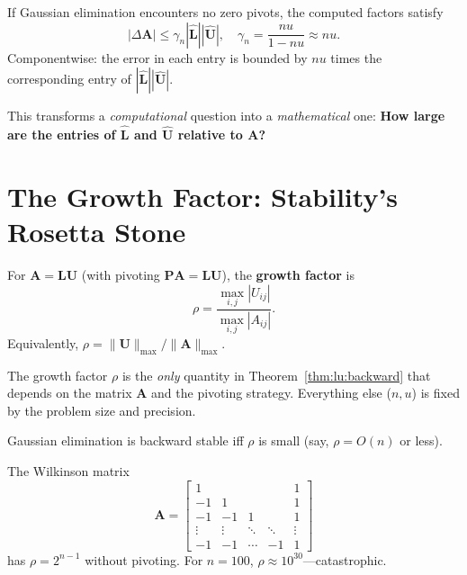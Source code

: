 \begin{theorem}
\label{thm:lu:backward}
If Gaussian elimination encounters no zero pivots, the computed factors satisfy
\[
|\Delta\bm{A}| \le \gamma_n |\hat{\bm{L}}| |\hat{\bm{U}}|,
\quad \gamma_n = \frac{nu}{1-nu} \approx nu.
\]
Componentwise: the error in each entry is bounded by $nu$ times the corresponding entry of $|\hat{\bm{L}}||\hat{\bm{U}}|$.
\end{theorem}

This transforms a \emph{computational} question into a \emph{mathematical} one: \textbf{How large are the entries of $\hat{\bm{L}}$ and $\hat{\bm{U}}$ relative to $\bm{A}$?}

\section{The Growth Factor: Stability's Rosetta Stone}
\label{sec:ge:growth}

\begin{definition}
\label{def:growth}
For $\bm{A} = \bm{L}\bm{U}$ (with pivoting $\bm{P}\bm{A} = \bm{L}\bm{U}$), the \textbf{growth factor} is
\[
\rho = \frac{\max_{i,j} |U_{ij}|}{\max_{i,j} |A_{ij}|}.
\]
Equivalently, $\rho = \|\bm{U}\|_{\max} / \|\bm{A}\|_{\max}$.
\end{definition}

The growth factor $\rho$ is the \emph{only} quantity in Theorem~\ref{thm:lu:backward} that depends on the matrix $\bm{A}$ and the pivoting strategy. Everything else ($n, u$) is fixed by the problem size and precision.

\begin{corollary}
Gaussian elimination is backward stable iff $\rho$ is small (say, $\rho = O(n)$ or less).
\end{corollary}

\begin{example}
The Wilkinson matrix \cite{urschel2025numerical}
\[
\bm{A} = \begin{bmatrix}
1 & & & & 1 \\
-1 & 1 & & & 1 \\
-1 & -1 & 1 & & 1 \\
\vdots & \vdots & \ddots & \ddots & \vdots \\
-1 & -1 & \cdots & -1 & 1
\end{bmatrix}
\]
has $\rho = 2^{n-1}$ without pivoting. For $n=100$, $\rho \approx 10^{30}$---catastrophic.
\end{example}

